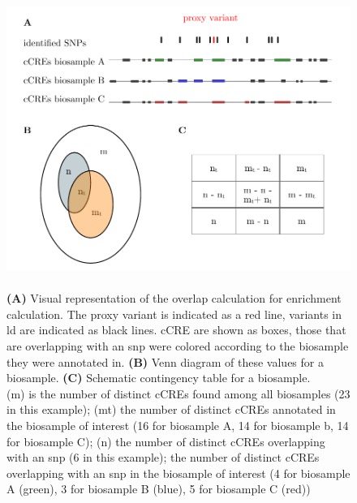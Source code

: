 \begin{figure}[h]
\capstart
    \centering
    \includegraphics{Abbildung/enrichment.pdf}

    \begin{minipage}{\captionwidth}
        \caption[enrichment]{\\
        \textbf{(A)} Visual representation of the overlap calculation for enrichment calculation. The proxy variant is indicated as a red line, variants in \ac{ld} are indicated as black lines. \ac{cCRE} are shown as boxes, those that are overlapping with an \ac{snp} were colored according to the biosample they were annotated in. \textbf{(B)} Venn diagram of these values for a biosample. \textbf{(C)} Schematic contingency table for a biosample. \\
        (m) is the number of distinct \acp{cCRE} found among all biosamples (23 in this example); (mt) the number of distinct \acp{cCRE} annotated in the biosample of interest (16 for biosample A, 14 for biosample b, 14 for biosample C); (n) the number of distinct \acp{cCRE} overlapping with an \ac{snp} (6 in this example);  the number of distinct \acp{cCRE} overlapping with an \ac{snp} in the biosample of interest (4 for biosample A (green), 3 for biosample B (blue), 5 for biosample C (red))}
        \label{fig:enrichment}
    \end{minipage}
\end{figure}
